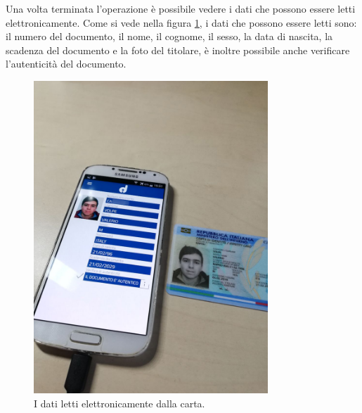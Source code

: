 Una volta terminata l'operazione è possibile vedere i dati che possono essere letti elettronicamente. Come si vede nella figura \ref{fig:carta_letta}, i dati che possono essere letti sono: il numero del documento, il nome, il cognome, il sesso, la data di nascita, la scadenza del documento e la foto del titolare, è inoltre possibile anche verificare l'autenticità del documento.

\begin{figure}[h!]
  \centering
  \includegraphics[width=250pt]{pictures/carta_letta.jpg}
  \caption{I dati letti elettronicamente dalla carta.}
  \label{fig:carta_letta}
\end{figure}
